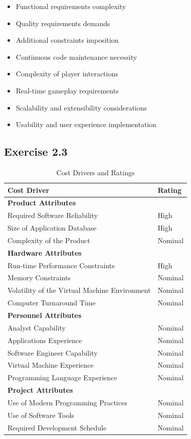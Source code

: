 \documentclass[a4paper]{scrartcl}
\begin{document}
\begin{itemize}
  \item Functional requirements complexity
  \item Quality requirements demands
  \item Additional constraints imposition
  \item Continuous code maintenance necessity
  \item Complexity of player interactions
  \item Real-time gameplay requirements
  \item Scalability and extensibility considerations
  \item Usability and user experience implementation
\end{itemize}

\subsection*{Exercise 2.3}

\begin{table}[h]
  \centering
  \begin{tabular}{|l|l|}
  \hline
  \textbf{Cost Driver} & \textbf{Rating} \\
  \hline
  \textbf{Product Attributes} &  \\
  \hline
  Required Software Reliability & High \\
  Size of Application Database & High \\
  Complexity of the Product & Nominal \\
  \hline
  \textbf{Hardware Attributes} &  \\
  \hline
  Run-time Performance Constraints & High \\
  Memory Constraints & Nominal \\
  Volatility of the Virtual Machine Environment & Nominal \\
  Computer Turnaround Time & Nominal \\
  \hline
  \textbf{Personnel Attributes} &  \\
  \hline
  Analyst Capability & Nominal \\
  Applications Experience & Nominal \\
  Software Engineer Capability & Nominal \\
  Virtual Machine Experience & Nominal \\
  Programming Language Experience & Nominal \\
  \hline
  \textbf{Project Attributes} &  \\
  \hline
  Use of Modern Programming Practices & Nominal \\
  Use of Software Tools & Nominal \\
  Required Development Schedule & Nominal \\
  \hline
  \end{tabular}
  \caption{Cost Drivers and Ratings}
  \label{tab:cost_drivers}
  \end{table}
\end{document}
